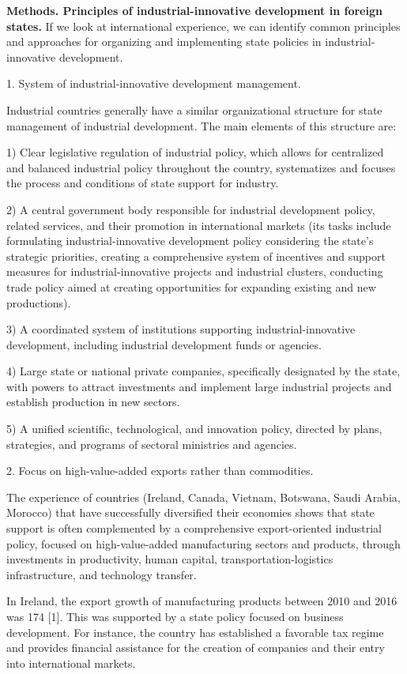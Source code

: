 {\bfseries Methods. Principles of industrial-innovative development in
foreign states.} If we look at international experience, we can identify
common principles and approaches for organizing and implementing state
policies in industrial-innovative development.

1. System of industrial-innovative development management.

Industrial countries generally have a similar organizational structure
for state management of industrial development. The main elements of
this structure are:

1) Clear legislative regulation of industrial policy, which allows for
centralized and balanced industrial policy throughout the country,
systematizes and focuses the process and conditions of state support for
industry.

2) A central government body responsible for industrial development
policy, related services, and their promotion in international markets
(its tasks include formulating industrial-innovative development policy
considering the state's strategic priorities, creating a comprehensive
system of incentives and support measures for industrial-innovative
projects and industrial clusters, conducting trade policy aimed at
creating opportunities for expanding existing and new productions).

3) A coordinated system of institutions supporting industrial-innovative
development, including industrial development funds or agencies.

4) Large state or national private companies, specifically designated by
the state, with powers to attract investments and implement large
industrial projects and establish production in new sectors.

5) A unified scientific, technological, and innovation policy, directed
by plans, strategies, and programs of sectoral ministries and agencies.

2. Focus on high-value-added exports rather than commodities.

The experience of countries (Ireland, Canada, Vietnam, Botswana, Saudi
Arabia, Morocco) that have successfully diversified their economies
shows that state support is often complemented by a comprehensive
export-oriented industrial policy, focused on high-value-added
manufacturing sectors and products, through investments in productivity,
human capital, transportation-logistics infrastructure, and technology
transfer.

In Ireland, the export growth of manufacturing products between 2010 and
2016 was 174 {[}1{]}. This was supported by a state policy focused on
business development. For instance, the country has established a
favorable tax regime and provides financial assistance for the creation
of companies and their entry into international markets.

